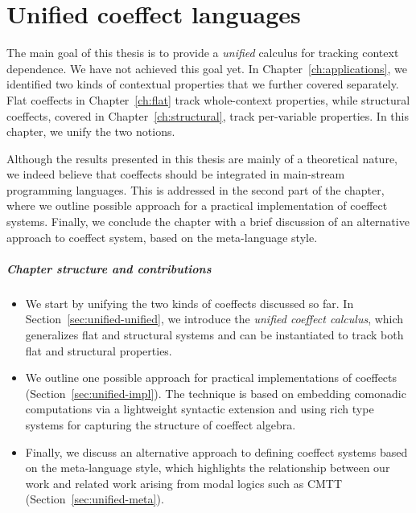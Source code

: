 
\chapter{Unified coeffect languages} 
\label{ch:unified} 


The main goal of this thesis is to provide a \emph{unified} calculus for tracking context 
dependence. We have not achieved this goal yet. In Chapter~\ref{ch:applications}, we identified 
two kinds of contextual properties that we further covered separately. Flat coeffects in 
Chapter~\ref{ch:flat} track whole-context properties, while structural coeffects, covered in 
Chapter~\ref{ch:structural}, track per-variable properties. In this chapter, we unify the two 
notions.

Although the results presented in this thesis are mainly of a theoretical nature, we indeed 
believe that coeffects should be integrated in main-stream programming languages. This is addressed
in the second part of the chapter, where we outline possible approach for a practical implementation
of coeffect systems. Finally, we conclude the chapter with a brief discussion of an alternative
approach to coeffect system, based on the meta-language style.

\paragraph{Chapter structure and contributions}
\begin{itemize}
\item We start by unifying the two kinds of coeffects discussed so far. In 
  Section~\ref{sec:unified-unified}, we introduce the \emph{unified coeffect calculus}, which 
  generalizes flat and structural systems and can be instantiated to track both flat and structural 
  properties. 

\item We outline one possible approach for practical implementations of coeffects 
  (Section~\ref{sec:unified-impl}). The technique is based on embedding comonadic computations
  via a lightweight syntactic extension and using rich type systems for capturing the structure of 
  coeffect algebra.

\item Finally, we discuss an alternative approach to defining coeffect systems based on the
  meta-language style, which highlights the relationship between our work and related work arising 
  from modal logics such as CMTT \cite{logic-cmtt} (Section~\ref{sec:unified-meta}).
\end{itemize}

